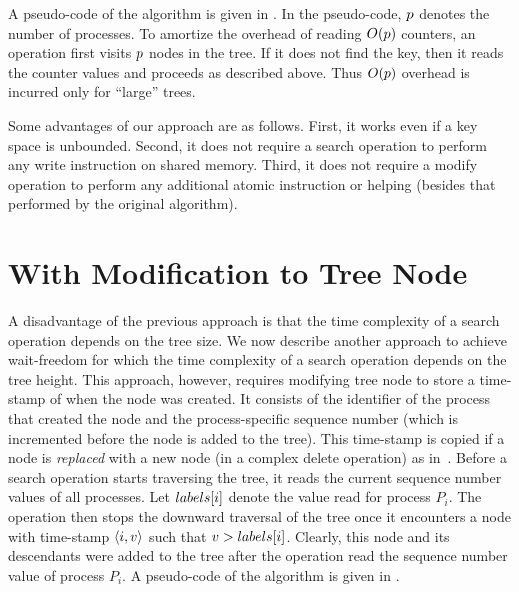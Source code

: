 \begin{limitscope}
A pseudo-code of the algorithm is given in . In the pseudo-code, $p$ denotes the number of processes. To amortize the overhead of reading $O(p)$ counters, an operation first visits $p$ nodes in the tree. If it does not find the key, then it reads the counter values and proceeds as described above. Thus $O(p)$ overhead is incurred only for ``large'' trees.

Some advantages of our approach are as follows. First, it works even if a key space is unbounded. Second, it does not require a search operation to perform any write instruction on shared memory. Third, it does not require a modify operation to perform any additional atomic instruction or helping (besides that performed by the original algorithm). 



\section{With Modification to Tree Node}
A disadvantage of the previous approach is that the time complexity of a search operation depends on the tree size. We now describe another approach to achieve wait-freedom for which the time complexity of a search operation depends on the tree height. This approach, however, requires modifying tree node to store a time-stamp of when the node was created. It consists of the identifier of the process that created the node and the process-specific sequence number (which is incremented before the node is added to the tree). This time-stamp is copied if a node is \emph{replaced} with a new node (in a complex delete operation) as in~\cite{RamMit:2015:ICDCN}. Before a search operation starts traversing the tree, it reads the current sequence number values of all processes. Let $labels[i]$ denote the value read for process $P_i$. The operation then stops the downward traversal of the tree once it encounters a node with time-stamp $\langle i,v \rangle$ such that $v > labels[i]$. Clearly, this node and its descendants were added to the tree after the operation read the sequence number value of process $P_i$.
A pseudo-code of the algorithm is given in .
\end{limitscope}